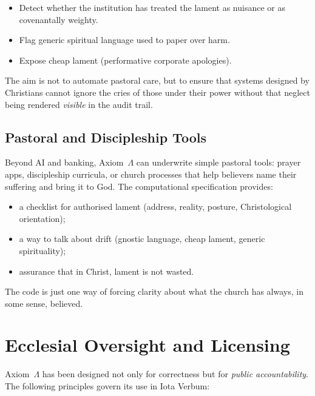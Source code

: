 \documentclass[11pt]{article}
\begin{document}
\begin{itemize}
  \item Detect whether the institution has treated the lament as nuisance or as covenantally weighty.
  \item Flag generic spiritual language used to paper over harm.
  \item Expose cheap lament (performative corporate apologies).
\end{itemize}

The aim is not to automate pastoral care, but to ensure that systems designed by Christians cannot ignore the cries of those under their power without that neglect being rendered \emph{visible} in the audit trail.

\subsection{Pastoral and Discipleship Tools}

Beyond AI and banking, Axiom~$\Lambda$ can underwrite simple pastoral tools: prayer apps, discipleship curricula, or church processes that help believers name their suffering and bring it to God. The computational specification provides:

\begin{itemize}
  \item a checklist for authorised lament (address, reality, posture, Christological orientation);
  \item a way to talk about drift (gnostic language, cheap lament, generic spirituality);
  \item assurance that in Christ, lament is not wasted.
\end{itemize}

The code is just one way of forcing clarity about what the church has always, in some sense, believed.

\section{Ecclesial Oversight and Licensing}

Axiom~$\Lambda$ has been designed not only for correctness but for \emph{public accountability}. The following principles govern its use in Iota Verbum:
\end{document}
